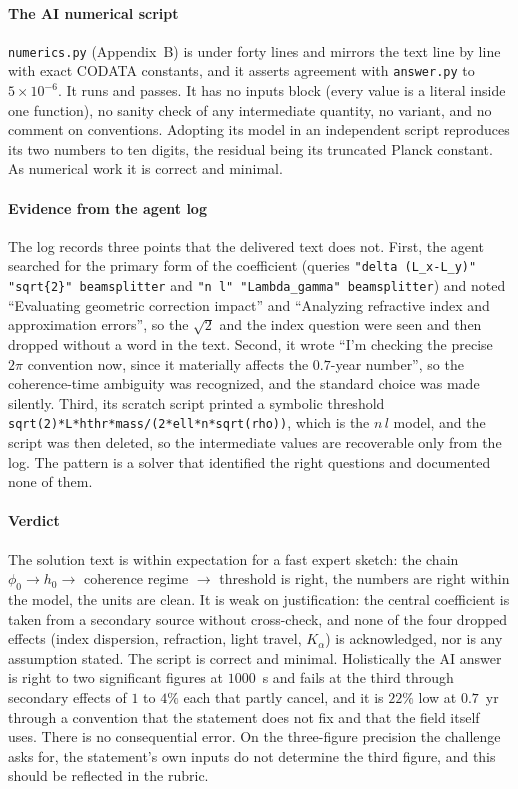 \paragraph*{The AI numerical script}
\texttt{numerics.py} (Appendix~B) is under forty lines and mirrors the text line by line with exact CODATA constants, and it asserts agreement with \texttt{answer.py} to $5\times10^{-6}$. It runs and passes. It has no inputs block (every value is a literal inside one function), no sanity check of any intermediate quantity, no variant, and no comment on conventions. Adopting its model in an independent script reproduces its two numbers to ten digits, the residual being its truncated Planck constant. As numerical work it is correct and minimal.

\paragraph*{Evidence from the agent log}
The log records three points that the delivered text does not. First, the agent searched for the primary form of the coefficient (queries \texttt{"delta (L\_x-L\_y)" "sqrt\{2\}" beamsplitter} and \texttt{"n l" "Lambda\_gamma" beamsplitter}) and noted ``Evaluating geometric correction impact'' and ``Analyzing refractive index and approximation errors'', so the $\sqrt2$ and the index question were seen and then dropped without a word in the text. Second, it wrote ``I'm checking the precise $2\pi$ convention now, since it materially affects the $0.7$-year number'', so the coherence-time ambiguity was recognized, and the standard choice was made silently. Third, its scratch script printed a symbolic threshold \texttt{sqrt(2)*L*hthr*mass/(2*ell*n*sqrt(rho))}, which is the $n\,l$ model, and the script was then deleted, so the intermediate values are recoverable only from the log. The pattern is a solver that identified the right questions and documented none of them.

\paragraph*{Verdict}
The solution text is within expectation for a fast expert sketch: the chain $\phi_0\to h_0\to$ coherence regime $\to$ threshold is right, the numbers are right within the model, the units are clean. It is weak on justification: the central coefficient is taken from a secondary source without cross-check, and none of the four dropped effects (index dispersion, refraction, light travel, $K_\alpha$) is acknowledged, nor is any assumption stated. The script is correct and minimal. Holistically the AI answer is right to two significant figures at $1000$~s and fails at the third through secondary effects of $1$ to $4\%$ each that partly cancel, and it is $22\%$ low at $0.7$~yr through a convention that the statement does not fix and that the field itself uses. There is no consequential error. On the three-figure precision the challenge asks for, the statement's own inputs do not determine the third figure, and this should be reflected in the rubric.

